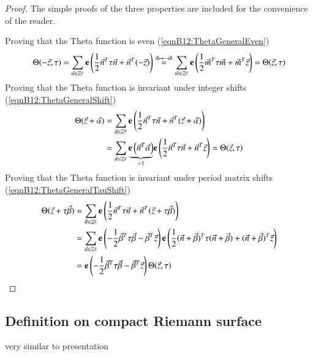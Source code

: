 \begin{proof} The simple proofs of the three properties are included for the convenience of the reader.

    Proving that the Theta function is even (\ref{eqnB12:ThetaGeneralEven})
    \begin{align}
        \Theta(-\vec z,\tau) = \sum_{\vec n \in \mathbb Z^g} \mathbf{e}\left(\frac{1}{2} \vec n^T \tau \vec n + \vec n^T (-\vec z)\right) \overset{\vec n \mapsto -\vec m}{=} \sum_{\vec m \in \mathbb Z^g} \mathbf{e}\left(\frac{1}{2} \vec m^T \tau \vec m + \vec m^T \vec z\right) = \Theta(\vec z, \tau)
    \end{align}
    Proving that the Theta function is invariant under integer shifts (\ref{eqnB12:ThetaGeneralShift})
    \begin{align}
        \Theta(\vec z + \vec \alpha) &= \sum_{\vec n \in \mathbb Z^g} \mathbf{e}\left(\frac{1}{2} \vec n^T \tau \vec n + \vec n^T (\vec z + \vec \alpha)\right) \\ &=
        \sum_{\vec n \in \mathbb Z^g} \underset{=1}{\underbrace{\mathbf{e}\left(\vec n^T \vec \alpha\right)}} \mathbf{e}\left(\frac{1}{2} \vec n^T \tau \vec n + \vec n^T \vec z\right) = \Theta(\vec z, \tau)
    \end{align}
    Proving that the Theta function is invariant under period matrix shifts (\ref{eqnB12:ThetaGeneralTauShift})
    \begin{align}
        \Theta(\vec z + \tau \vec \beta) &= \sum_{\vec n \in \mathbb Z^g} \mathbf{e}\left(\frac{1}{2} \vec n^T \tau \vec n + \vec n^T (\vec z + \tau \vec \beta)\right) \\ &=
        \sum_{\vec n \in \mathbb Z^g}
        \mathbf{e}\left(-\frac{1}{2} \vec \beta^T \tau \vec \beta - \vec \beta^T \vec z\right) \mathbf{e}\left(\frac{1}{2} (\vec n+\vec \beta)^T \tau (\vec n+\vec \beta) + (\vec n+\vec \beta)^T \vec z\right)\\
        &=  \mathbf{e}\left(-\frac{1}{2} \vec \beta^T \tau \vec \beta - \vec \beta^T \vec z\right) \Theta(\vec z, \tau) 
    \end{align}
\end{proof}

\subsection{Definition on compact Riemann surface}
very similar to presentation

